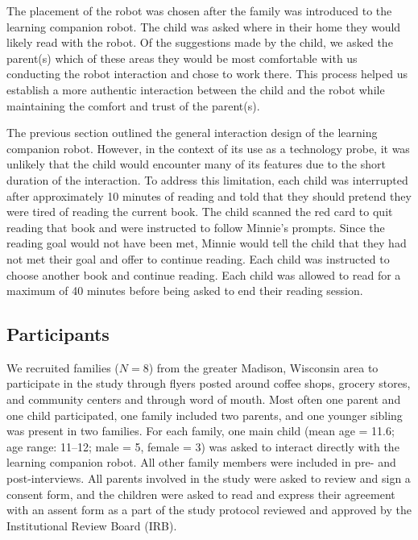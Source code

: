 \documentclass{sigchi}
\begin{document}
The placement of the robot was chosen after the family was introduced to the learning companion robot. The child was asked where in their home they would likely read with the robot. Of the suggestions made by the child, we asked the parent(s) which of these areas they would be most comfortable with us conducting the robot interaction and chose to work there. This process helped us establish a more authentic interaction between the child and the robot while maintaining the comfort and trust of the parent(s).

The previous section outlined the general interaction design of the learning companion robot. However, in the context of its use as a technology probe, it was unlikely that the child would encounter many of its features due to the short duration of the interaction. To address this limitation, each child was interrupted after approximately 10 minutes of reading and told that they should pretend they were tired of reading the current book. The child scanned the red card to quit reading that book and were instructed to follow Minnie's prompts. Since the reading goal would not have been met, Minnie would tell the child that they had not met their goal and offer to continue reading. Each child was instructed to choose another book and continue reading. Each child was allowed to read for a maximum of 40 minutes before being asked to end their reading session.


\subsection{Participants}

 We recruited families ($N=8$) from the greater Madison, Wisconsin area to participate in the study through flyers posted around coffee shops, grocery stores, and community centers and through word of mouth. Most often one parent and one child participated, one family included two parents, and one younger sibling was present in two families. For each family, one main child (mean age = 11.6; age range: 11--12; male = 5, female = 3) was asked to interact directly with the learning companion robot. All other family members were included in pre- and post-interviews. All parents involved in the study were asked to review and sign a consent form, and the children were asked to read and express their agreement with an assent form as a part of the study protocol reviewed and approved by the Institutional Review Board (IRB).
\end{document}
